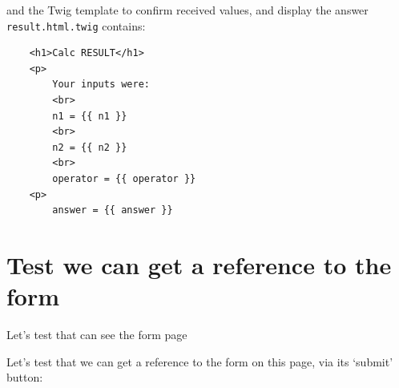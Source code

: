 \documentclass[a4paperpaper,openright]{book}
\newenvironment{Shaded}{}{}
\newcommand{\CommentTok}[1]{\textcolor[rgb]{0.38,0.63,0.69}{\textit{#1}}}
\newcommand{\KeywordTok}[1]{\textcolor[rgb]{0.00,0.44,0.13}{\textbf{#1}}}
\newcommand{\NormalTok}[1]{#1}
\newcommand{\OtherTok}[1]{\textcolor[rgb]{0.00,0.44,0.13}{#1}}
\newcommand{\StringTok}[1]{\textcolor[rgb]{0.25,0.44,0.63}{#1}}
\begin{document}
and the Twig template to confirm received values, and display the answer
\texttt{result.html.twig} contains:

\begin{verbatim}
    <h1>Calc RESULT</h1>
    <p>
        Your inputs were:
        <br>
        n1 = {{ n1 }}
        <br>
        n2 = {{ n2 }}
        <br>
        operator = {{ operator }}
    <p>
        answer = {{ answer }}
\end{verbatim}

\hypertarget{test-we-can-get-a-reference-to-the-form}{%
\section{Test we can get a reference to the
form}\label{test-we-can-get-a-reference-to-the-form}}

Let's test that can see the form page

\begin{Shaded}
\end{Shaded}

Let's test that we can get a reference to the form on this page, via its
`submit' button:
\end{document}
